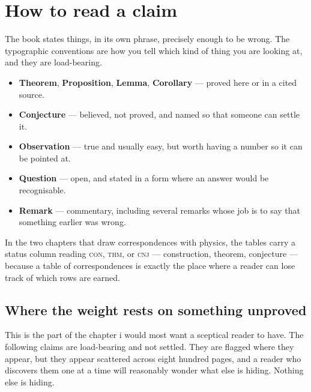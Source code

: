 \section*{How to read a claim}

The book states things, in its own phrase, precisely enough to be
wrong.
The typographic conventions are how you tell which kind of thing
you are looking at, and they are load-bearing.

\begin{itemize}[leftmargin=1.6em, itemsep=3pt]
\item \textbf{Theorem}, \textbf{Proposition}, \textbf{Lemma},
      \textbf{Corollary} --- proved here or in a cited source.
\item \textbf{Conjecture} --- believed, not proved, and named so
      that someone can settle it.
\item \textbf{Observation} --- true and usually easy, but worth
      having a number so it can be pointed at.
\item \textbf{Question} --- open, and stated in a form where an
      answer would be recognisable.
\item \textbf{Remark} --- commentary, including several remarks
      whose job is to say that something earlier was wrong.
\end{itemize}

\noindent
In the two chapters that draw correspondences with physics, the
tables carry a status column reading \textsc{con}, \textsc{thm}, or
\textsc{cnj} --- construction, theorem, conjecture --- because a
table of correspondences is exactly the place where a reader can
lose track of which rows are earned.

\subsection*{Where the weight rests on something unproved}

This is the part of the chapter i would most want a sceptical
reader to have.
The following claims are load-bearing and not settled.
They are flagged where they appear, but they appear scattered
across eight hundred pages, and a reader who discovers them one at a
time will reasonably wonder what else is hiding.
Nothing else is hiding.

